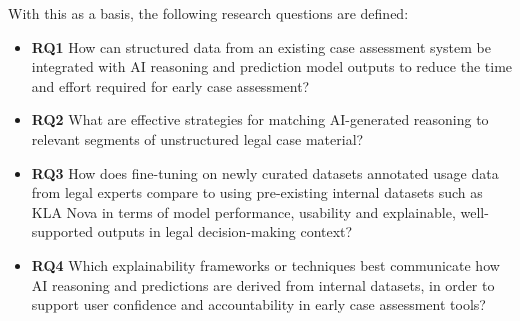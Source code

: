 With this as a basis, the following research questions are defined:
\begin{itemize}
  \item \textbf{RQ1} \- How can structured data from an existing case assessment system be integrated with AI reasoning and prediction model outputs to reduce the time and effort required for early case assessment?
  \item \textbf{RQ2} \- What are effective strategies for matching AI-generated reasoning to relevant segments of unstructured legal case material?
  \item \textbf{RQ3} \- How does fine-tuning on newly curated datasets annotated usage data from legal experts compare to using pre-existing internal datasets such as KLA Nova in terms of model performance, usability and explainable, well-supported outputs in legal decision-making context?
  \item \textbf{RQ4} \- Which explainability frameworks or techniques best communicate how AI reasoning and predictions are derived from internal datasets, in order to support user confidence and accountability in early case assessment tools?
\end{itemize}